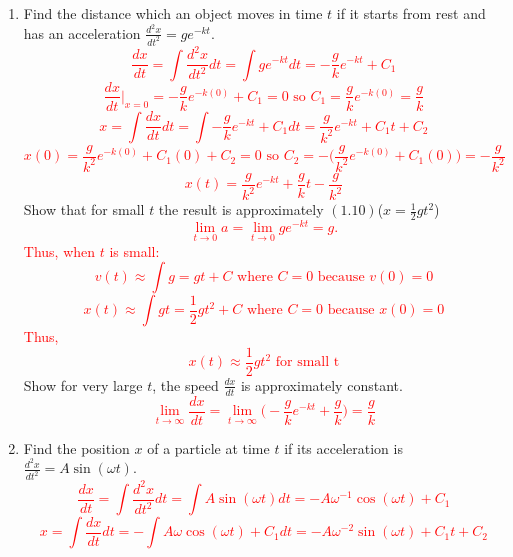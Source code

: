 \documentclass{article}
\begin{document}
\begin{enumerate}
\begin{enumerate}
    \end{enumerate}
    \item Find the distance which an object moves in time $t$ if it starts from rest and has an acceleration $\frac{d^2x}{dt^2} = ge^{-kt}$.
    \textcolor{red}{
    \[
    \frac{dx}{dt} = \int \frac{d^2x}{dt^2} dt= \int ge^{-kt} dt = -\frac{g}{k}e^{-kt}+C_1
    \]
    \[
    \frac{dx}{dt}\Big|_{x=0} = -\frac{g}{k}e^{-k(0)}+C_1 = 0 \text{ so } C_1 = \frac{g}{k}e^{-k(0)} = \frac{g}{k}
    \]
    \[
    x = \int \frac{dx}{dt} dt= \int -\frac{g}{k}e^{-kt}+C_1 dt = \frac{g}{k^2}e^{-kt}+C_1t+C_2
    \]
    \[
    x(0)= \frac{g}{k^2}e^{-k(0)}+C_1(0)+C_2 = 0 \text{ so } C_2 = -\Big(\frac{g}{k^2}e^{-k(0)}+C_1(0)\Big) = -\frac{g}{k^2}
    \]
    \[
    x(t) = \frac{g}{k^2}e^{-kt}+\frac{g}{k}t-\frac{g}{k^2}
    \]
    }
    Show that for small $t$ the result is approximately $(1.10)$($x=\frac{1}{2}gt^2$) 
    \textcolor{red}{ 
    \[
        \lim_{t\rightarrow0} a = \lim_{t\rightarrow0} ge^{-kt} = g.
    \]
    Thus, when $t$ is small:
    \[
        v(t) \approx \int g = gt+C \text{ where } C = 0 \text{ because }v(0) = 0
    \]
    \[
        x(t) \approx \int gt = \frac{1}{2}gt^2+C \text{ where } C = 0 \text{ because }x(0) = 0
    \]
    Thus, 
    \[
        x(t) \approx  \frac{1}{2}gt^2 \text { for small t}
    \]
    }
    Show for very large $t$, the speed $\frac{dx}{dt}$ is approximately constant.
    \textcolor{red}{
    \[
    \lim_{t \rightarrow \infty}\frac{dx}{dt} = \lim_{t \rightarrow \infty} \Big(-\frac{g}{k}e^{-kt}+\frac{g}{k}\Big) = \frac{g}{k}
    \]
    }
\pagebreak
    \item Find the position $x$ of a particle at time $t$ if its acceleration is $\frac{d^2x}{dt^2} = A \sin (\omega t)$.
    \textcolor{red}{
    \[
    \frac{dx}{dt}=\int\frac{d^2x}{dt^2}dt = \int A \sin (\omega t)dt=-A\omega^{-1} \cos (\omega t) + C_1
    \]
    \[
    x=\int\frac{dx}{dt}dt = -\int A\omega \cos (\omega t) + C_1 dt = -A\omega^{-2} \sin (\omega t) + C_1t+C_2
    \]
    }
\end{enumerate}
\end{document}
